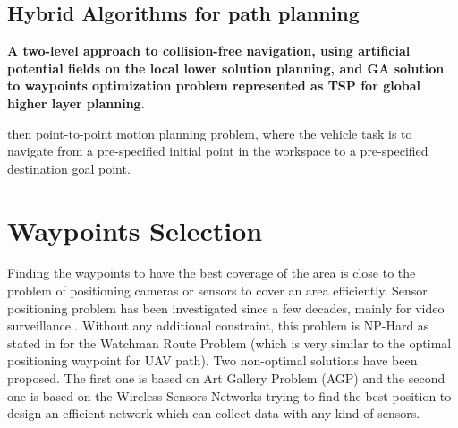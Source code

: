 
\subsection{Hybrid Algorithms for path planning}

\textbf{A two-level approach to collision-free navigation, using
artificial potential fields on the local lower solution planning, and GA solution to waypoints optimization problem represented as TSP for global higher layer planning}. 

then point-to-point motion planning problem, where the vehicle task is to navigate from a pre-specified initial point in the workspace to a pre-specified destination goal point.

\section{Waypoints Selection}

Finding the waypoints to have the best coverage of the area is close to the problem of positioning cameras or sensors to cover an area efficiently. Sensor positioning problem has been investigated since a few decades, mainly for video surveillance \cite{c1}. Without any additional constraint, this problem is NP-Hard as stated in \cite{c1,c2,c3,c4,c5} for the Watchman Route Problem (which is very similar to the optimal positioning waypoint for UAV path). Two non-optimal solutions have been proposed. The first one is based on Art Gallery Problem (AGP) \cite{c2,c3} and the second one is based on the Wireless Sensors Networks \cite{c6,c7,c8,c9} trying to find the best position to design an efficient network which can collect data with any kind of sensors. 

